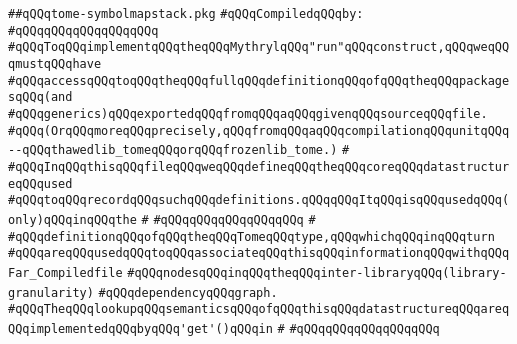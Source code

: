 \label{src/app/makelib/depend/tome-symbolmapstack.pkg}
\verb|##qQQqtome-symbolmapstack.pkg|\newline
\newline
\verb|#qQQqCompiledqQQqby:|\newline
\verb|#qQQqqQQqqQQqqQQqqQQq|\newline
\newline
\newline
\newline
\verb|#qQQqToqQQqimplementqQQqtheqQQqMythrylqQQq"run"qQQqconstruct,qQQqweqQQqmustqQQqhave|\newline
\verb|#qQQqaccessqQQqtoqQQqtheqQQqfullqQQqdefinitionqQQqofqQQqtheqQQqpackagesqQQq(and|\newline
\verb|#qQQqgenerics)qQQqexportedqQQqfromqQQqaqQQqgivenqQQqsourceqQQqfile.|\newline
\verb|#qQQq(OrqQQqmoreqQQqprecisely,qQQqfromqQQqaqQQqcompilationqQQqunitqQQq--qQQqthawedlib_tomeqQQqorqQQqfrozenlib_tome.)|\newline
\verb|#|\newline
\verb|#qQQqInqQQqthisqQQqfileqQQqweqQQqdefineqQQqtheqQQqcoreqQQqdatastructureqQQqused|\newline
\verb|#qQQqtoqQQqrecordqQQqsuchqQQqdefinitions.qQQqqQQqItqQQqisqQQqusedqQQq(only)qQQqinqQQqthe|\newline
\verb|#|\newline
\verb|#qQQqqQQqqQQqqQQqqQQq|\newline
\verb|#|\newline
\verb|#qQQqdefinitionqQQqofqQQqtheqQQqTomeqQQqtype,qQQqwhichqQQqinqQQqturn|\newline
\verb|#qQQqareqQQqusedqQQqtoqQQqassociateqQQqthisqQQqinformationqQQqwithqQQqFar_Compiledfile|\newline
\verb|#qQQqnodesqQQqinqQQqtheqQQqinter-libraryqQQq(library-granularity)|\newline
\verb|#qQQqdependencyqQQqgraph.|\newline
\newline
\verb|#qQQqTheqQQqlookupqQQqsemanticsqQQqofqQQqthisqQQqdatastructureqQQqareqQQqimplementedqQQqbyqQQq'get'()qQQqin|\newline
\verb|#|\newline
\verb|#qQQqqQQqqQQqqQQqqQQq|\newline
